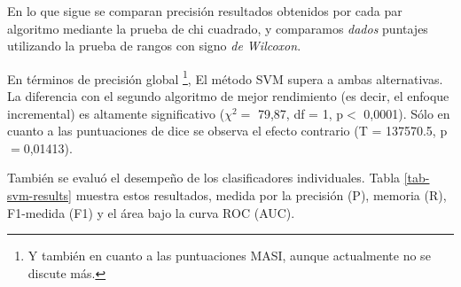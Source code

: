 



En lo que sigue se comparan precisi\'on resultados obtenidos por cada par algoritmo mediante la prueba de chi cuadrado, y comparamos {\em dados} puntajes utilizando la prueba de rangos con signo {\em de Wilcoxon}.

En t\'erminos de precisi\'on global \footnote{Y tambi\'en en cuanto a las puntuaciones MASI, aunque actualmente no se discute m\'as.}, El m\'etodo SVM supera a ambas alternativas. La diferencia con el segundo algoritmo de mejor rendimiento (es decir, el enfoque incremental) es altamente significativo ($\chi^{2}=$ 79,87, df = 1, p$<$ 0,0001). S\'olo en cuanto a las puntuaciones de dice se observa el efecto contrario (T = 137570.5, p$=$0,01413).

Tambi\'en se evalu\'o el desempe\~no de los clasificadores individuales. Tabla \ref{tab-svm-results} muestra estos resultados, medida por la precisi\'on (P), memoria (R), F1-medida (F1) y el \'area bajo la curva ROC (AUC).

